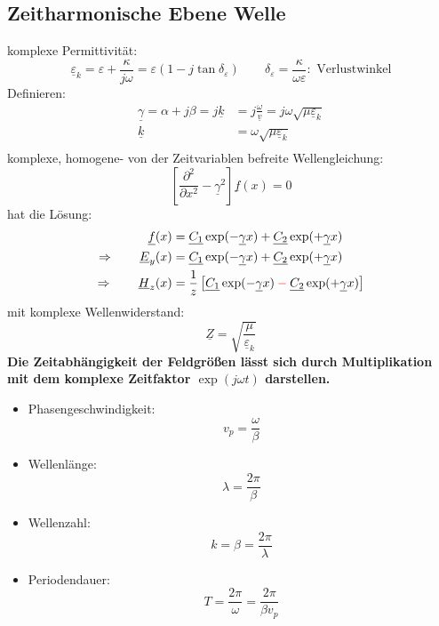 \documentclass[nochapterpage,bigchapter,linedtoc,longdoc,colorback,accentcolor=tud2c]{tudreport}
\newcommand*{\mathcolor}{}
\def\mathcolor#1#{\mathcoloraux{#1}}
\newcommand*{\mathcoloraux}[3]{%
  \protect\leavevmode
  \begingroup
    \color#1{#2}#3%
  \endgroup
}
\begin{document}
\subsection{Zeitharmonische Ebene Welle}
komplexe Permittivität:
\begin{equation*}
	\underline{\varepsilon}_k = \varepsilon + \frac{\kappa}{j \omega} = \varepsilon(1- j \tan \delta_\varepsilon) \qquad  \delta_\varepsilon= \frac{\kappa}{\omega \varepsilon} : \text{ Verlustwinkel}
\end{equation*}
Definieren:
\begin{equation*}
	\begin{aligned}
		\underline{\gamma} = \alpha + j \beta = j \underline{k} &= j \frac{\omega}{\underline{v}} = j \omega \sqrt{\mu \underline{\varepsilon}_k} \\
	\underline{k} &= \omega \sqrt{\mu \underline{\varepsilon}_k} \\
	\end{aligned}
\end{equation*}
komplexe, homogene- von der Zeitvariablen befreite Wellengleichung:
\begin{equation*}
	\left[ \frac{\partial^2}{\partial x^2} - \underline{\gamma}^2 \right]\underline{f}(x) =0
\end{equation*}
hat die Lösung:
\begin{equation*}
	\begin{aligned}
		\underline{f}(x) &= \underline{C_1} \exp(-\underline{\gamma}x) + \underline{C_2} \exp(+\underline{\gamma}x) \\
	\Rightarrow \qquad	\underline{E}_y(x) &= \underline{C_1} \exp(-\underline{\gamma}x) + \underline{C_2} \exp(+\underline{\gamma}x) \\
	\Rightarrow \qquad \underline{H}_z(x) &= \frac{1}{z}\left[ \underline{C_1} \exp(-\underline{\gamma}x) \mathcolor{red}{-} \underline{C_2} \exp(+\underline{\gamma}x) \right]	 \\
	\end{aligned}
\end{equation*}
mit komplexe Wellenwiderstand: $$\underline{Z} = \sqrt{\frac{\mu }{\underline{\varepsilon}_k}}$$
\textbf{Die Zeitabhängigkeit der Feldgrößen lässt sich durch Multiplikation mit dem komplexe Zeitfaktor $\exp(j \omega t)$ darstellen.}
\begin{itemize}
	\item Phasengeschwindigkeit: $$v_p = \frac{\omega}{\beta}$$
	\item Wellenlänge: $$\lambda = \frac{2 \pi}{\beta}$$
	\item Wellenzahl: $$k = \beta = \frac{2\pi}{\lambda}$$
	\item Periodendauer: $$T = \frac{2\pi}{\omega} = \frac{2\pi}{\beta v_p}$$
\end{itemize}
\end{document}
